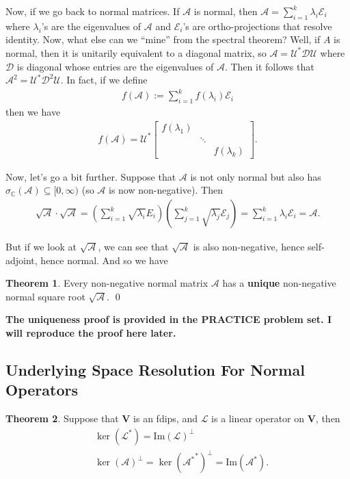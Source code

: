 \documentclass{article}
\theoremstyle{definition}
\newtheorem{thm}{Theorem}[section]
\newcommand{\C}{\mathbb{C}}
\newcommand{\Uni}{\mathcal{U}}
\newcommand{\V}{\mathbf{V}}
\newcommand{\A}{\mathcal{A}}
\newcommand{\lag}{\mathcal{L}}
\newcommand{\E}{\mathcal{E}}
\newcommand{\ima}{\text{Im}}
\newcommand{\lp}{\left(}
\newcommand{\rp}{\right)}
\begin{document}
Now, if we go back to normal matrices. If $\A$ is normal, then $\A = \sum^k_{i=1}\lambda_i \E_i$ where $\lambda_i$'s are the eigenvalues of $\A$ and $\E_i$'s are ortho-projections that resolve identity. Now, what else can we ``mine'' from the spectral theorem? Well, if $A$ is normal, then it is unitarily equivalent to a diagonal matrix, so $\A = \Uni^* \mathcal{D} \Uni$ where $\mathcal{D}$ is diagonal whose entries are the eigenvalues of $\A$. Then it follows that $\A^2 = \Uni^* \mathcal{D}^2 \Uni$. In fact, if we define
\begin{align*}
f(\A) := \sum^k_{i=1}f(\lambda_i)\E_i
\end{align*}
then we have 
\begin{align*}
f(\A) = \Uni^* \begin{bmatrix}
f(\lambda_1) && \\
& \ddots & \\
& & f(\lambda_k)
\end{bmatrix}.
\end{align*}


Now, let's go a bit further. Suppose that $\A$ is not only normal but also has $\sigma_\C(\A) \subseteq [0,\infty)$ (so $\A$ is now non-negative). Then 
\begin{align*}
\sqrt{\A}\cdot \sqrt{\A} = \lp \sum^k_{i=1}\sqrt{\lambda_i} E_i \rp \lp \sum^k_{j=1}\sqrt{\lambda_j}\E_j  \rp = \sum^k_{i=1}\lambda_i\E_i = \A.
\end{align*}

But if we look at $\sqrt{\A}$, we can see that $\sqrt{\A}$ is also non-negative, hence self-adjoint, hence normal. And so we have

\begin{thm}
	Every non-negative normal matrix $\A$ has a \textbf{unique} non-negative normal square root $\sqrt{\A}$. \qed
\end{thm}

\textbf{The uniqueness proof is provided in the PRACTICE problem set. I will reproduce the proof here later. }


\subsection{Underlying Space Resolution For Normal Operators}

\begin{thm}
	Suppose that $\V$ is an fdips, and $\lag$ is a linear operator on $\V$, then 
	\begin{align*}
	&\ker(\lag^*) = \ima(\lag)^\perp\\
	&\ker(\A)^\perp = \ker({\A^*}^*)^\perp = \ima(\A^*).
	\end{align*}
\end{thm}
\end{document}
